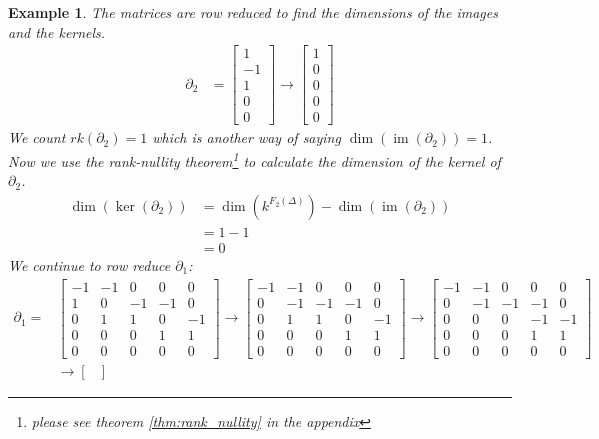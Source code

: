 \documentclass[11pt,a4paper,twoside]{report}
\newtheorem{myex}[mythm]{Example}
\DeclareMathOperator{\im}{im}
\begin{document}
\begin{myex}
The matrices are row reduced to find the dimensions of the images and the kernels.
\begin{align*}
\partial_2&= 
\begin{bmatrix}
1\\
-1\\
1\\
0\\
0
\end{bmatrix}
\to
\begin{bmatrix}
1\\
0\\
0\\
0\\
0
\end{bmatrix}
\end{align*}
We count $rk(\partial_2)=1$ which is another way of saying $\dim(\im(\partial_2))=1$. Now we use the rank-nullity theorem\footnote{please see theorem \ref{thm:rank_nullity} in the appendix} to calculate the dimension of the kernel of $\partial_2$.
\begin{align*}
\dim(\ker(\partial_2))&=\dim(k^{F_2(\Delta)})-\dim(\im(\partial_2))\\
&=1-1\\
&= 0
\end{align*}
We continue to row reduce $\partial_1$:
\begin{align*}
\partial_1=&
\begin{bmatrix}
-1 & -1 & 0 & 0 & 0\\
1 & 0 & -1 & -1 & 0\\
0 & 1 & 1 & 0 & -1\\
0 & 0 & 0 & 1 & 1\\
0 & 0 & 0 & 0 & 0
\end{bmatrix}
\to
\begin{bmatrix}
-1 & -1 & 0 & 0 & 0\\
0 & -1 & -1 & -1 & 0\\
0 & 1 & 1 & 0 & -1\\
0 & 0 & 0 & 1 & 1\\
0 & 0 & 0 & 0 & 0
\end{bmatrix}
\to
\begin{bmatrix}
-1 & -1 & 0 & 0 & 0\\
0 & -1 & -1 & -1 & 0\\
0 & 0 & 0 & -1 & -1\\
0 & 0 & 0 & 1 & 1\\
0 & 0 & 0 & 0 & 0
\end{bmatrix}\\
&\to
\begin{bmatrix}

\end{bmatrix}
\end{align*}
\end{myex}
\end{document}
